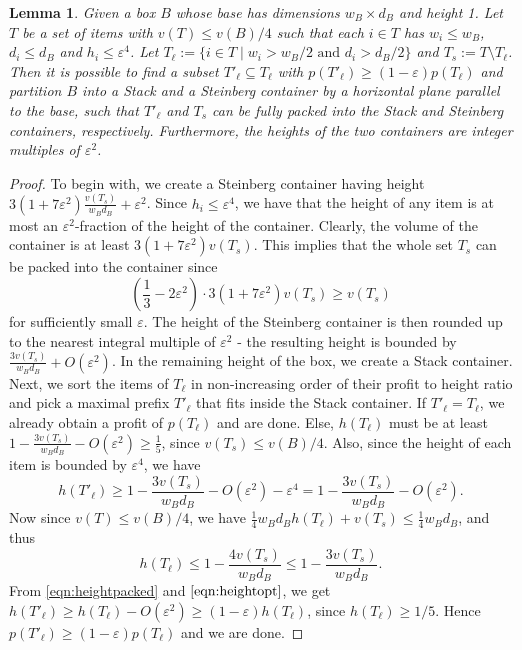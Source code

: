 \documentclass[10pt,a4paper]{amsart}
\newcommand{\kvnr}[1]{}
\renewcommand{\epsilon}{\varepsilon} %
\newtheorem{lemma}[theorem]{Lemma}
\theoremstyle{definition}
\begin{document}
\begin{lemma}
\label{lem:stackandsteincombine}
    Given a box $B$ whose base has dimensions $w_B\times d_B$ and height 1. Let $T$ be a set of items with $v(T)\le v(B)/4$ such that each $i\in T$ has $w_i \le w_B$, $d_i \le d_B$ and  $h_i\le \epsilon^4$. Let $T_{\ell} := \{i\in T \mid w_i > w_B/2 \text{ and } d_i > d_B/2\}$ and $T_s := T\setminus T_{\ell}$. Then it is possible to find a subset $T'_{\ell}\subseteq T_{\ell}$ with $p(T'_{\ell}) \ge (1-\epsilon)p(T_{\ell})$ and partition $B$ into a Stack and a Steinberg container by a horizontal plane parallel to the base, such that $T'_{\ell}$ and $T_s$ can be fully packed into the Stack and Steinberg containers, respectively. Furthermore, the heights of the two containers are integer multiples of $\epsilon^2$.
\end{lemma}
\begin{proof}
    To begin with, we create a Steinberg container having height $3(1+7\epsilon^2)\frac{v(T_s)}{w_Bd_B}+\epsilon^2$. Since $h_i \le \epsilon^4$, we have that the height of any item is at most an $\epsilon^2$-fraction of the height of the container. Clearly, the volume of the container is at least $3(1+7\epsilon^2)v(T_s)$. This implies that the whole set $T_s$ can be packed into the container since 
    \[ \left(\frac{1}{3}-2\epsilon^2\right)\cdot 3(1+7\epsilon^2)v(T_s) \ge v(T_s)\]
    for sufficiently small $\epsilon$. The height of the Steinberg container is then rounded up to the nearest integral multiple of $\epsilon^2$ - the resulting height is bounded by $\frac{3v(T_s)}{w_Bd_B}+O(\epsilon^2)$. In the remaining height of the box, we create a Stack container. Next, we sort the items of $T_{\ell}$ in non-increasing order of their profit to height ratio and pick a maximal prefix $T'_{\ell}$ that fits inside the Stack container. If $T'_{\ell} = T_{\ell}$, we already obtain a profit of $p(T_{\ell})$ and are done. Else, $h(T_{\ell})$ must be at least $1-\frac{3v(T_s)}{w_Bd_B}-O(\epsilon^2) \ge \frac{1}{5}$, since $v(T_s) \le v(B)/4$. Also, since the height of each item is bounded by $\epsilon^4$, we have 
    \begin{equation}
    \label{eqn:heightpacked}
        h(T'_{\ell}) \ge 1-\frac{3v(T_s)}{w_Bd_B}-O(\epsilon^2) - \epsilon^4 = 1-\frac{3v(T_s)}{w_Bd_B}-O(\epsilon^2).
    \end{equation}
    Now since $v(T) \le v(B)/4$, we have $\frac{1}{4}w_Bd_Bh(T_{\ell}) + v(T_s) \le \frac{1}{4}w_Bd_B$, and thus
    \begin{equation}
    \label{eqn:heightopt}
        h(T_{\ell}) \le 1 - \frac{4v(T_s)}{w_Bd_B}\le 1-\frac{3v(T_s)}{w_Bd_B}.
    \end{equation}
    From \eqref{eqn:heightpacked} and $\eqref{eqn:heightopt}$, we get $h(T'_{\ell}) \ge h(T_{\ell})-O(\epsilon^2) \ge (1-\epsilon)h(T_{\ell})$, since $h(T_{\ell})\ge 1/5$. Hence $p(T'_{\ell})\ge (1-\epsilon)p(T_{\ell})$ and we are done.   
    \kvnr{Low priority. Display math punctuation is not correct.}
\end{proof}
\end{document}
